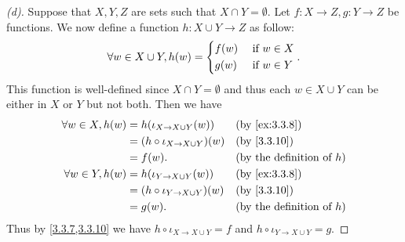 \begin{proof}[(d)]
  Suppose that \(X, Y, Z\) are sets such that \(X \cap Y = \emptyset\).
  Let \(f : X \to Z, g : Y \to Z\) be functions.
  We now define a function \(h : X \cup Y \to Z\) as follow:
  \[
    \forall w \in X \cup Y, h(w) = \begin{dcases}
      f(w) & \text{ if } w \in X \\
      g(w) & \text{ if } w \in Y
    \end{dcases}.
  \]
  This function is well-defined since \(X \cap Y = \emptyset\) and thus each \(w \in X \cup Y\) can be either in \(X\) or \(Y\) but not both.
  Then we have
  \begin{align*}
    \forall w \in X, h(w) & = h(\iota_{X \to X \cup Y}(w))        &  & \by{ex:3.3.8}                       \\
                          & = (h \circ \iota_{X \to X \cup Y})(w) &  & \by{3.3.10}                         \\
                          & = f(w).                               &  & \text{(by the definition of \(h\))} \\
    \forall w \in Y, h(w) & = h(\iota_{Y \to X \cup Y}(w))        &  & \by{ex:3.3.8}                       \\
                          & = (h \circ \iota_{Y \to X \cup Y})(w) &  & \by{3.3.10}                         \\
                          & = g(w).                               &  & \text{(by the definition of \(h\))}
  \end{align*}
  Thus by \cref{3.3.7,3.3.10} we have \(h \circ \iota_{X \to X \cup Y} = f\) and \(h \circ \iota_{Y \to X \cup Y} = g\).


\end{proof}
